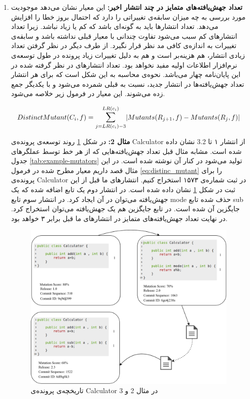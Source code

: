 \begin{enumerate}
\item 
\textbf{
		تعداد جهش‌یافته‌های متمایز در چند انتشار اخیر:} این معیار نشان می‌دهد موجودیت مورد بررسی به چه میزان سابقه‌ی تغییراتی را دارد که احتمال بروز خطا را افزایش می‌دهد. تعداد انتشارها باید به گونه‌ای باشد که کم یا زیاد نباشد. زیرا تعداد انتشارهای کم سبب می‌شود تفاوت چندانی با معیار قبلی نداشته باشد و سابقه‌ی تغییرات به اندازه‌ی کافی مد نظر قرار نگیرد. از طرف دیگر در نظر گرفتن تعداد زیادی انتشار، هم هزینه‌بر است و هم به دلیل تغییرات زیاد  پرونده در طول توسعه‌ی نرم‌افزار اطلاعات اولیه مفید نخواهد بود.  تعداد انتشارهای  در نظر گرفته شده در این پایان‌نامه چهار می‌باشد. نحوه‌ی محاسبه به این شکل است که برای هر انتشار تعداد جهش‌یافته‌ها در انتشار جدید، نسبت به قبلی  شمرده می‌شود و با یکدیگر جمع زده  می‌شوند. این معیار در فرمول زیر خلاصه می‌شود. 
	

\begin{equation} \label{eq:distinc_mutant}
DistinctMutant(C_i,f) = \mathlarger{\sum}\limits_{j=LR(c_i)-3}^{LR(c_i)} 
| Mutants(R_{j+1},f) - Mutants(R_j,f)|
\end{equation}

	
\textbf{مثال 2:}
در شکل \ref{fig:example2} روند توسعه‌ی پرونده‌ی  Calculator از انتشار ۱ تا  3.2 نشان داده شده است. مشابه مثال قبل تعداد جهش‌یافته‌هایی که از هر خط توسط عملگرهای جدول \ref{tab:example-mutators}  تولید می‌شود در کنار آن نوشته شده است. در این مثال قصد داریم معیار مطرح شده  در فرمول \ref{eq:distinc_mutant} را برای پرونده‌ی Calculator‌ در ثبت  شماره‌ی ۱۵۷۳ استخراج کنیم. انتشارهای‌ ما قبل از این ثبت در شکل  \ref{fig:example2} نشان داده شده است. در انتشار دوم یک تابع اضافه شده که یک جهش‌یافته می‌توان در آن ایجاد کرد. در انتشار سوم تابع mode حذف شده  تابع sub جایگزین آن شده است. در تابع جایگزین هم یک جهش‌یافته می‌توان استخراج کرد. در نهایت تعداد جهش‌یافته‌های متمایز در انتشارهای ما قبل برابر ۳ خواهد بود. 


\begin{figure}[H]
	\centering
	\includegraphics[width=1\textwidth]{img/method/example2.png}
	\caption{ تاریخچه‌ی پرونده‌ی Calculator در مثال 2 و 3}
	\label{fig:example2}
\end{figure}


\end{enumerate}
